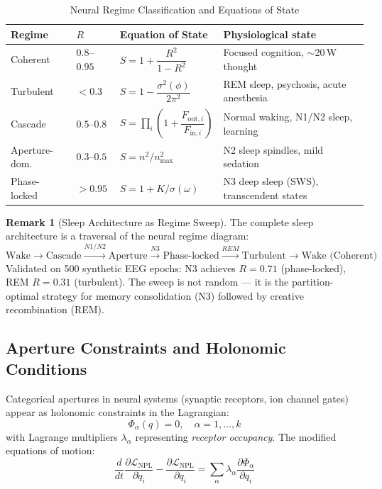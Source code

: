 \documentclass[12pt,a4paper]{article}
\theoremstyle{definition}
\newtheorem{remark}{Remark}
\newcommand{\LNPL}{\mathcal{L}_{\text{NPL}}}
\begin{document}
\begin{table}[H]
\centering
\caption{Neural Regime Classification and Equations of State}
\label{tab:neural_regimes}
\begin{tabular}{lllp{4.5cm}}
\toprule
\textbf{Regime} & \textbf{$R$} & \textbf{Equation of State} & \textbf{Physiological state}\\
\midrule
Coherent & $0.8$--$0.95$ & $S = 1 + \dfrac{R^2}{1-R^2}$ & Focused cognition, $\sim$20\,W thought\\[8pt]
Turbulent & $<0.3$ & $S = 1 - \dfrac{\sigma^2(\phi)}{2\pi^2}$ & REM sleep, psychosis, acute anesthesia\\[8pt]
Cascade & $0.5$--$0.8$ & $S = \prod_i\!\left(1 + \dfrac{F_{\text{out},i}}{F_{\text{in},i}}\right)$ & Normal waking, N1/N2 sleep, learning\\[8pt]
Aperture-dom. & $0.3$--$0.5$ & $S = n^2/n^2_{\max}$ & N2 sleep spindles, mild sedation\\[8pt]
Phase-locked & $>0.95$ & $S = 1 + K/\sigma(\omega)$ & N3 deep sleep (SWS), transcendent states\\[8pt]
\bottomrule
\end{tabular}
\end{table}

\begin{remark}[Sleep Architecture as Regime Sweep]
The complete sleep architecture is a traversal of the neural regime diagram:
\begin{equation}
\text{Wake} \xrightarrow{} \text{Cascade} \xrightarrow{N1/N2} \text{Aperture}
\xrightarrow{N3} \text{Phase-locked} \xrightarrow{REM} \text{Turbulent}
\xrightarrow{} \text{Wake (Coherent)}
\end{equation}
Validated on 500 synthetic EEG epochs: N3 achieves $R = 0.71$ (phase-locked),
REM $R = 0.31$ (turbulent). The sweep is not random — it is the
partition-optimal strategy for memory consolidation (N3) followed by
creative recombination (REM).
\end{remark}

\subsection{Aperture Constraints and Holonomic Conditions}

Categorical apertures in neural systems (synaptic receptors, ion channel
gates) appear as holonomic constraints in the Lagrangian:
\begin{equation}
\Phi_{\alpha}(q) = 0, \quad \alpha = 1, \ldots, k
\end{equation}
with Lagrange multipliers $\lambda_\alpha$ representing \emph{receptor occupancy}.
The modified equations of motion:
\begin{equation}
\frac{d}{dt}\frac{\partial \LNPL}{\partial \dot{q}_i} - \frac{\partial \LNPL}{\partial q_i}
= \sum_\alpha \lambda_\alpha \frac{\partial \Phi_\alpha}{\partial q_i}
\end{equation}
\end{document}
